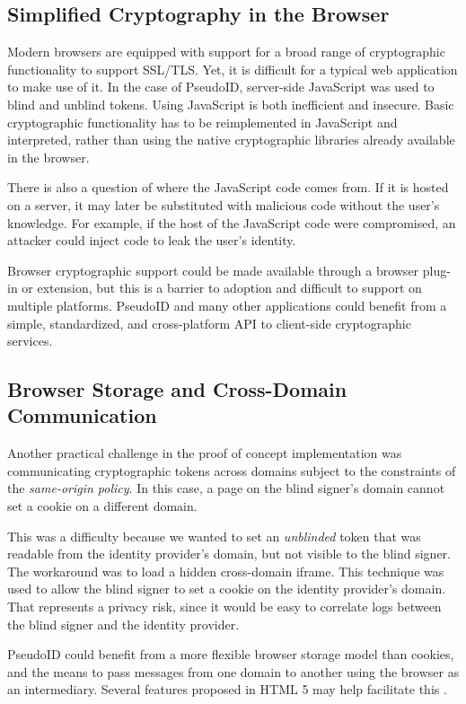 \documentclass{llncs}
\begin{document}
\subsection{Simplified Cryptography in the Browser}

Modern browsers are equipped with support for a broad range of
cryptographic functionality to support SSL/TLS. Yet, it is difficult
for a typical web application to make use of it. In the case of
PseudoID, server-side JavaScript was used to blind and unblind
tokens. Using JavaScript is both inefficient and insecure. Basic
cryptographic functionality has to be reimplemented in JavaScript and
interpreted, rather than using the native cryptographic libraries
already available in the browser.

There is also a question of where the JavaScript code comes from. If
it is hosted on a server, it may later be substituted with malicious
code without the user's knowledge. For example, if the host of the
JavaScript code were compromised, an attacker could inject code to
leak the user's identity.

Browser cryptographic support could be made available through
a browser plug-in or extension, but this is a barrier to adoption and
difficult to support on multiple platforms. PseudoID and many other
applications could benefit from a simple, standardized, and
cross-platform API to client-side cryptographic services.

\subsection{Browser Storage and Cross-Domain Communication}

Another practical challenge in the proof of concept implementation was
communicating cryptographic tokens across domains subject to the
constraints of the \emph{same-origin policy}. In this case, a page on
the blind signer's domain cannot set a cookie on a different domain.

This was a difficulty because we wanted to set an \textit{unblinded}
token that was readable from the identity provider's domain, but not visible to the
blind signer. The workaround was to load a hidden cross-domain
iframe. This technique was used to allow the blind signer to set a
cookie on the identity provider's domain. That represents a privacy
risk, since it would be easy to correlate logs between the blind
signer and the identity provider.

PseudoID could benefit from a more flexible browser storage model than
cookies, and the means to pass messages from one domain to another
using the browser as an intermediary. Several features proposed in
HTML 5 may help facilitate this \cite{HTML5}.
\end{document}

